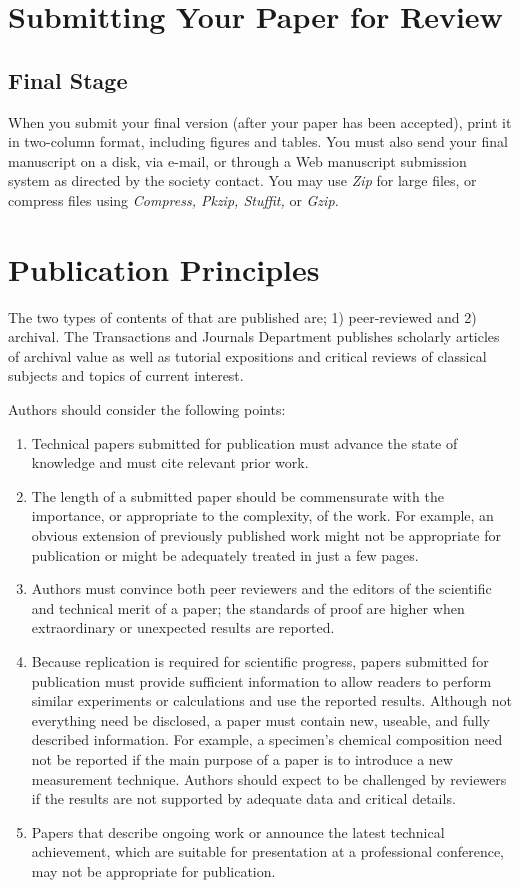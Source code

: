 \documentclass[journal,twoside,web]{ieeecolor}
\begin{document}
\section{Submitting Your Paper for Review}

\subsection{Final Stage}
When you submit your final version (after your paper has been accepted), 
print it in two-column format, including figures and tables. You must also 
send your final manuscript on a disk, via e-mail, or through a Web 
manuscript submission system as directed by the society contact. You may use 
\emph{Zip} for large files, or compress files using \emph{Compress, Pkzip, Stuffit,} or \emph{Gzip.} 

\section{Publication Principles}
The two types of contents of that are published are; 1) peer-reviewed and 2) 
archival. The Transactions and Journals Department publishes scholarly 
articles of archival value as well as tutorial expositions and critical 
reviews of classical subjects and topics of current interest. 

Authors should consider the following points:

\begin{enumerate}
\item Technical papers submitted for publication must advance the state of knowledge and must cite relevant prior work. 
\item The length of a submitted paper should be commensurate with the importance, or appropriate to the complexity, of the work. For example, an obvious extension of previously published work might not be appropriate for publication or might be adequately treated in just a few pages.
\item Authors must convince both peer reviewers and the editors of the scientific and technical merit of a paper; the standards of proof are higher when extraordinary or unexpected results are reported. 
\item Because replication is required for scientific progress, papers submitted for publication must provide sufficient information to allow readers to perform similar experiments or calculations and 
use the reported results. Although not everything need be disclosed, a paper 
must contain new, useable, and fully described information. For example, a 
specimen's chemical composition need not be reported if the main purpose of 
a paper is to introduce a new measurement technique. Authors should expect 
to be challenged by reviewers if the results are not supported by adequate 
data and critical details.
\item Papers that describe ongoing work or announce the latest technical achievement, which are suitable for presentation at a professional conference, may not be appropriate for publication.
\end{enumerate}
\end{document}
